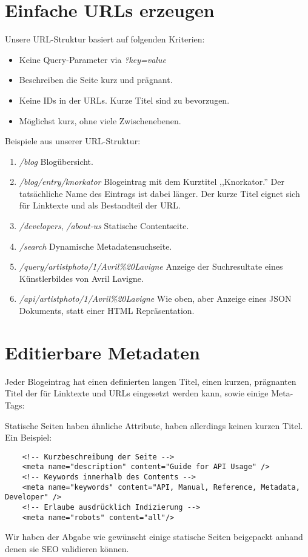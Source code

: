\section{Einfache URLs erzeugen}
Unsere URL-Struktur basiert auf folgenden Kriterien:
\begin{itemize}
\item Keine Query-Parameter via \emph{?key=value}
\item Beschreiben die Seite kurz und prägnant.
\item Keine IDs in der URLs. Kurze Titel sind zu bevorzugen.
\item Möglichst kurz, ohne viele Zwischenebenen.
\end{itemize}


Beispiele aus unserer URL-Struktur:
\begin{enumerate}
    \item \emph{/blog} Blogübersicht.
    \item \emph{/blog/entry/knorkator} Blogeintrag mit dem Kurztitel ,,Knorkator.''
          Der tatsächliche Name des Eintrags ist dabei länger. Der kurze Titel
          eignet sich für Linktexte und als Bestandteil der URL.
    \item \emph{/developers}, \emph{/about-us} Statische Contentseite.
    \item \emph{/search} Dynamische Metadatensuchseite.
    \item \emph{/query/artistphoto/1/Avril\%20Lavigne} Anzeige der Suchresultate
    eines Künstlerbildes von Avril Lavigne.
    \item \emph{/api/artistphoto/1/Avril\%20Lavigne} Wie oben, aber Anzeige
    eines JSON Dokuments, statt einer HTML Repräsentation.
\end{enumerate}

\section{Editierbare Metadaten}
Jeder Blogeintrag hat einen definierten langen Titel, einen kurzen, prägnanten
Titel der für Linktexte und URLs eingesetzt werden kann, sowie einige Meta-Tags:


Statische Seiten haben ähnliche Attribute, haben allerdings keinen kurzen Titel.
Ein Beispiel:

\begin{verbatim}
    <!-- Kurzbeschreibung der Seite -->
    <meta name="description" content="Guide for API Usage" />
    <!-- Keywords innerhalb des Contents -->
    <meta name="keywords" content="API, Manual, Reference, Metadata, Developer" />
    <!-- Erlaube ausdrücklich Indizierung -->
    <meta name="robots" content="all"/>
\end{verbatim}




Wir haben der Abgabe wie gewünscht einige statische Seiten beigepackt anhand denen sie SEO
validieren können.
